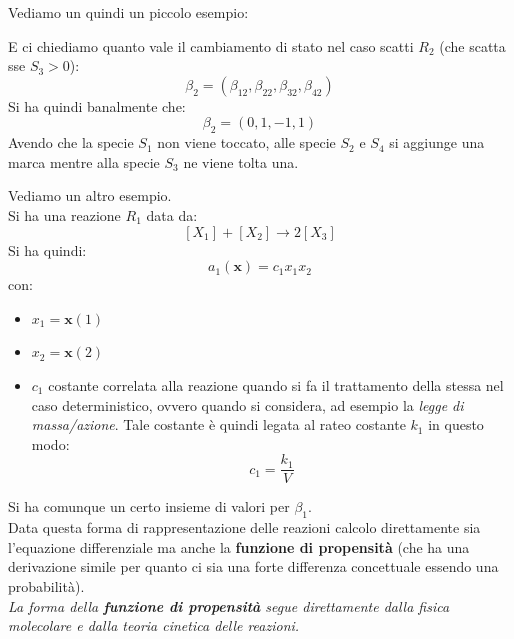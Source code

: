 \documentclass[a4paper,12pt, oneside]{book}
\begin{document}
\begin{esempio}
  Vediamo un quindi un piccolo esempio:
  \begin{figure}[H]
  \centering
\end{figure}
E ci chiediamo quanto vale il cambiamento di stato nel caso scatti $R_2$ (che
scatta sse $S_3>0$):
\[\beta_2=\left(\beta_{12}, \beta_{22},\beta_{32},\beta_{42}\right)\]
Si ha quindi banalmente che:
\[\beta_2=(0,1,-1,1)\]
Avendo che la specie $S_1$ non viene toccato, alle specie $S_2$ e $S_4$ si
aggiunge una marca mentre alla specie $S_3$ ne viene tolta una.
\end{esempio}
\begin{esempio}
  Vediamo un altro esempio.\\
  Si ha una reazione $R_1$ data da:
  \[[X_1]+[X_2]\to 2[X_3]\]
  Si ha quindi:
  \[a_1(\mathbf{x})=c_1x_1x_2\]
  con:
  \begin{itemize}
    \item $x_1=\mathbf{x}(1)$
    \item $x_2=\mathbf{x}(2)$
    \item $c_1$ costante correlata alla reazione quando si fa il trattamento
    della stessa nel caso deterministico, ovvero quando si considera, ad esempio
    la \textit{legge di massa/azione}. Tale costante è quindi legata al rateo
    costante $k_1$ in questo modo:
    \[c_1=\frac{k_1}{V}\]
  \end{itemize}
  Si ha comunque un certo insieme di valori per $\beta_1$.\\
  Data questa forma di rappresentazione delle reazioni calcolo direttamente sia
  l'equazione differenziale ma anche la \textbf{funzione di propensità} (che ha
  una derivazione simile per quanto ci sia una forte differenza concettuale
  essendo una probabilità).\\
  \emph{La forma della \textbf{funzione di propensità} segue direttamente dalla
    fisica molecolare e dalla teoria cinetica delle reazioni.}
\end{esempio}
\end{document}
